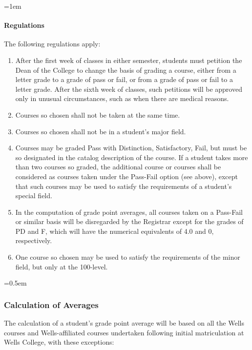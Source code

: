 \documentclass{manual}
\newcommand{\modified}[1]{}
\newcommand{\oldbreak}[1]{}
\let\oldsubsubsection\subsubsection
\renewcommand\subsubsection{\leftskip=0.5em\oldsubsubsection}
\let\oldparagraph\paragraph
\renewcommand\paragraph{\leftskip=1em\oldparagraph}
\newcommand{\itemLevelA}{\alph*.}
\newcommand{\itemRefA}{\alph*}
\begin{document}
\paragraph{Regulations}
The following regulations apply:

\begin{enumerate}[label=\itemLevelA,ref=\itemRefA]
\item After the first week of classes in either semester, students must petition the Dean of the College to change the basis of grading a course, either from a letter grade to a grade of pass or fail, or from a grade of pass or fail to a letter grade. After the sixth week of classes, such petitions will be approved only in unusual circumstances, such as when there are medical reasons.

\item Courses so chosen shall not be taken at the same time.

\item Courses so chosen shall not be in a student's major field.

\item Courses may be graded Pass with Distinction, Satisfactory, Fail, but must be so designated in the catalog description of the course. If a student takes more than two courses so graded, the additional course or courses shall be considered as courses taken under the Pass-Fail option (see above), except that such courses may be used to satisfy the requirements of a student's special field.

\item In the computation of grade point averages, all courses taken on a Pass-Fail or similar basis will be disregarded by the Registrar except for the grades of PD and F, which will have the numerical equivalents of 4.0 and 0, respectively.

\item One course so chosen may be used to satisfy the requirements of the minor field, but only at the 100-level.

\end{enumerate}

\oldbreak{V-4}

\subsubsection{Calculation of Averages}\modified{/24/89}

The calculation of a student's grade point average will be based on all the Wells courses and Wells-affiliated courses undertaken following  initial matriculation at Wells College, with these exceptions:
\end{document}
